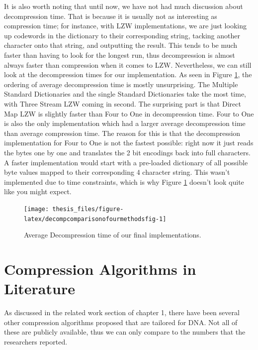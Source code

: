 \documentclass[12pt,twoside]{reedthesis}
\begin{document}
It is also worth noting that until now, we have not had much discussion about decompression time. That is because it is usually not as interesting as compression time; for instance, with LZW implementations, we are just looking up codewords in the dictionary to their corresponding string, tacking another character onto that string, and outputting the result. This tends to be much faster than having to look for the longest run, thus decompression is almost always faster than compression when it comes to LZW. Nevertheless, we can still look at the decompression times for our implementation. As seen in Figure \ref{fig:decompcomparisonofourmethodsfig}, the ordering of average decompression time is mostly unsurprising. The Multiple Standard Dictionaries and the single Standard Dictionaries take the most time, with Three Stream LZW coming in second. The surprising part is that Direct Map LZW is slightly faster than Four to One in decompression time. Four to One is also the only implementation which had a larger average decompression time than average compression time. The reason for this is that the decompression implementation for Four to One is not the fastest possible: right now it just reads the bytes one by one and translates the 2 bit encodings back into full characters. A faster implementation would start with a pre-loaded dictionary of all possible byte values mapped to their corresponding 4 character string. This wasn't implemented due to time constraints, which is why Figure \ref{fig:decompcomparisonofourmethodsfig} doesn't look quite like you might expect.
\begin{figure}

{\centering \texttt{[image: thesis\_files/figure-latex/decompcomparisonofourmethodsfig-1]} 

}

\caption{Average Decompression time of our final implementations.}\label{fig:decompcomparisonofourmethodsfig}
\end{figure}
\hypertarget{compression-algorithms-in-literature}{%
\section{Compression Algorithms in Literature}\label{compression-algorithms-in-literature}}

As discussed in the related work section of chapter 1, there have been several other compression algorithms proposed that are tailored for DNA. Not all of these are publicly available, thus we can only compare to the numbers that the researchers reported.
\end{document}
